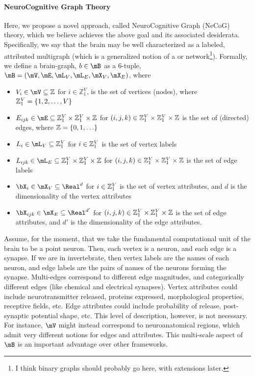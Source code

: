 \paragraph{NeuroCognitive Graph Theory}

Here, we propose a novel approach, called NeuroCognitive Graph (NeCoG) theory, which we believe achieves the above goal and its associated desiderata.  Specifically, we say that the brain may be well characterized as a labeled, attributed multigraph (which is a generalized notion of a or network\footnote{I think binary graphs should probably go here, with extensions later.}).  Formally, we define a brain-graph, $b\in \mB$ as a 6-tuple, $\mB=(\mV,\mE,\mL_V, \mL_E, \mX_V, \mX_E)$, where

\begin{itemize}
	\item $V_i \in \mV \subseteq \mathbb{Z}$ for $i \in \mathbb{Z}_1^V$, is the set of vertices (nodes), where $\mathbb{Z}_1^V=\{1,2,\ldots,V\}$ 
	\item $E_{ijk} \in \mE \subseteq \zov \times \zov \times \mathbb{Z}$ for $(i,j,k) \in \mathbb{Z}_1^V \times \mathbb{Z}_1^V \times \mathbb{Z}$ is the set of (directed) edges, where $\mathbb{Z}=\{0,1,\ldots\}$
	\item $L_i \in \mL_V \subseteq \zov$ for $i \in \mathbb{Z}_1^V$ is the set of vertex labels
	\item $L_{ijk} \in \mL_E \subseteq \zov \times \zov \times \zz$ for $(i,j,k) \in \mathbb{Z}_1^V \times \mathbb{Z}_1^V \times \mathbb{Z}$ is the set of edge labels
	\item $\bX_i \in \mX_V \subseteq \Real^d$ for $i \in \mathbb{Z}_1^V$ is the set of vertex attributes, and $d$ is the dimensionality of the vertex attributes
	\item $\bX_{ijk} \in \mX_E \subseteq \Real^{d'}$ for $(i,j,k) \in \mathbb{Z}_1^V \times \mathbb{Z}_1^V \times \mathbb{Z}$ is the set of edge attributes, and $d'$ is the dimensionality of the edge attributes.
\end{itemize}


Assume, for the moment, that we take the fundamental computational unit of the brain to be a point neuron.  Then, each vertex is a neuron, and each edge is a synapse.  If we are in invertebrate, then vertex labels are the names of each neuron, and edge labels are the pairs of names of the neurons forming the synapse.  Multi-edges correspond to different edge magnitudes, and categorically different edges (like chemical and electrical synapses). Vertex attributes could include neurotransmitter released, proteins expressed, morphological properties, receptive fields, etc.  Edge attributes could include probability of release, post-synaptic potential shape, etc.  This level of description, however, is not necessary.  For instance, $\mV$ might instead correspond to neuroanatomical regions, which admit very different notions for edges and attributes.  This multi-scale aspect of $\mB$ is an important advantage over other frameworks.  

